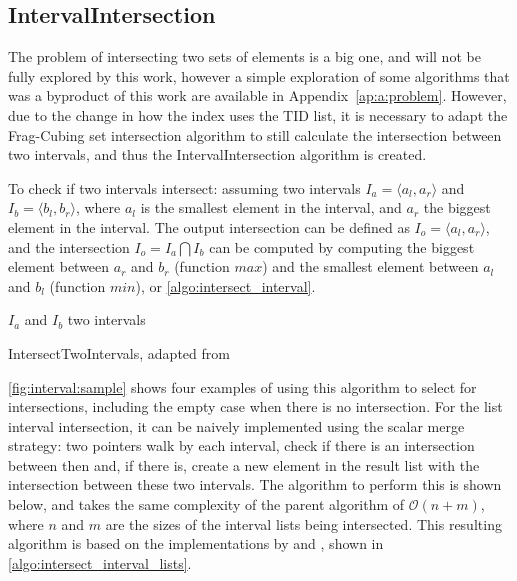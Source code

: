 \subsection{IntervalIntersection}\label{ch:interval:algo:intersection}

The problem of intersecting two sets of elements is a big one, and will not be fully explored by this work, however a simple exploration of some algorithms that was a byproduct of this work are available in Appendix~\ref{ap:a:problem}.
However, due to the change in how the index uses the TID list, it is necessary to adapt the Frag-Cubing set intersection algorithm to still calculate the intersection between two intervals, and thus the IntervalIntersection algorithm is created.

To check if two intervals intersect: assuming two intervals $I_a = \langle a_l, a_r \rangle$ and $I_b = \langle b_l, b_r \rangle$, where $a_l$ is the smallest element in the interval, and $a_r$ the biggest element in the interval.
The output intersection can be defined as $I_o = \langle a_l, a_r \rangle$, and the intersection $I_o = I_a \bigcap I_b$ can be computed by computing the biggest element between $a_r$ and $b_r$ (function $max$) and the smallest element between $a_l$ and $b_l$ (function $min$), or \autoref{algo:intersect_interval}.

\begin{algorithm}[!htb]
\SetAlgoLined
{}
 $I_a$ and $I_b$ two intervals\;
  \caption{IntersectTwoIntervals, adapted from \cite{26260}}\label{algo:intersect_interval}
\end{algorithm}

\autoref{fig:interval:sample} shows four examples of using this algorithm to select for intersections, including the empty case when there is no intersection.
For the list interval intersection, it can be naively implemented using the scalar merge strategy: two pointers walk by each interval, check if there is an intersection between then and, if there is, create a new element in the result list with the intersection between these two intervals.
The algorithm to perform this is shown below, and takes the same complexity of the parent algorithm of $\mathcal{O}(n + m)$, where $n$ and $m$ are the sizes of the interval lists being intersected.
This resulting algorithm is based on the implementations by \cite{liHighdimensionalOLAPMinimal2004} and \cite{silva:2015:abordagensParaCubo}, shown in \autoref{algo:intersect_interval_lists}.

